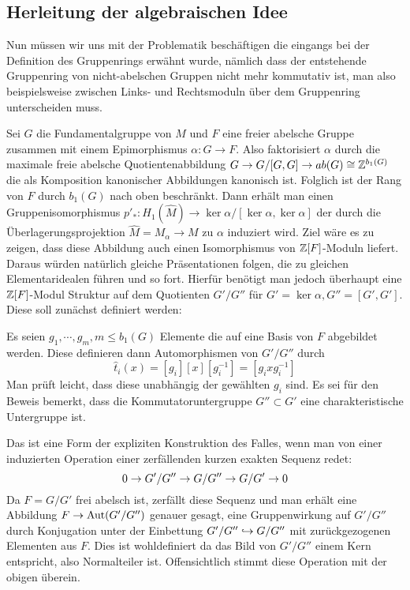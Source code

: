 \subsection{Herleitung der algebraischen Idee}
    
Nun müssen wir uns mit der Problematik beschäftigen die eingangs bei der Definition des Gruppenrings erwähnt wurde, nämlich dass der entstehende Gruppenring von nicht-abelschen Gruppen nicht mehr kommutativ ist, man also beispielsweise zwischen Links- und Rechtsmoduln über dem Gruppenring unterscheiden muss.

Sei $G$ die Fundamentalgruppe von $M$ und $F$ eine freier abelsche Gruppe zusammen mit einem Epimorphismus $\alpha:G \to F$. Also faktorisiert $\alpha$ durch die maximale freie abelsche Quotientenabbildung $G \to G/[G,G] \to ab(G) \cong \mathbb{Z}^{b_1(G)}$ die als Komposition kanonischer Abbildungen kanonisch ist. Folglich ist der Rang von $F$ durch $b_1(G)$ nach oben beschränkt. Dann erhält man einen Gruppenisomorphismus $p'_*: H_1(\hat M) \to \ker\alpha/[\ker\alpha,\ker\alpha]$ der durch die Überlagerungsprojektion $\hat M = M_\alpha \to M$ zu $\alpha$ induziert wird. Ziel wäre es zu zeigen, dass diese Abbildung auch einen Isomorphismus von $\mathbb{Z}[F]$-Moduln liefert. Daraus würden natürlich gleiche Präsentationen folgen, die zu gleichen Elementaridealen führen und so fort. Hierfür benötigt man jedoch überhaupt eine $\mathbb{Z}[F]$-Modul Struktur auf dem Quotienten $G'/G''$ für $G'=\ker\alpha, G''=[G',G']$. Diese soll zunächst definiert werden:

Es seien $g_1,\cdots,g_m,m\leq b_1(G)$ Elemente die auf eine Basis von $F$ abgebildet werden. Diese definieren dann Automorphismen von $G'/G''$ durch 
\[
	\hat t_i(x) =  [g_i]  [x][ g_i^{-1}] = [ g_i x g_i^{-1}]
\]
Man prüft leicht, dass diese unabhängig der gewählten $g_i$ sind. Es sei für den Beweis bemerkt, dass die Kommutatoruntergruppe $G''\subset G'$ eine charakteristische Untergruppe ist. 
\begin{bem}
 	Das ist eine Form der expliziten Konstruktion des Falles, wenn man von einer induzierten Operation einer zerfällenden kurzen exakten Sequenz redet:
 	\[
 		0\to G'/G''\to G/G''\to G/G'\to0
 	\]
 	Da $F= G/G'$ frei abelsch ist, zerfällt diese Sequenz und man erhält eine Abbildung $F \to \operatorname{Aut}(G'/G'')$ genauer gesagt, eine Gruppenwirkung auf $G'/G''$ durch Konjugation unter der Einbettung $G'/G''\hookrightarrow G/G''$ mit zurückgezogenen Elementen aus $F$. Dies ist wohldefiniert da das Bild von $G'/G''$ einem Kern entspricht, also Normalteiler ist. Offensichtlich stimmt diese Operation mit der obigen überein.
 \end{bem} 
 
